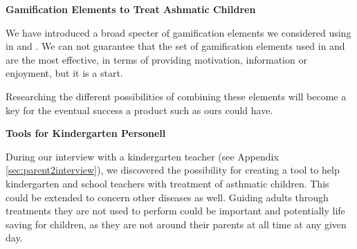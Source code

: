\textbf{Gamification Elements to Treat Ashmatic Children}

We have introduced a broad specter of gamification elements we considered using in \app{} and \ab{}. We can not guarantee that the set of gamification elements used in \app{} and \ab{} are the most effective, in terms of providing motivation, information or enjoyment, but it is a start. 

Researching the different possibilities of combining these elements will become a key for the eventual success a product such as ours could have.    


\textbf{Tools for Kindergarten Personell}

During our interview with a kindergarten teacher (see Appendix \ref{sec:parent2interview}), we discovered the possibility for creating a tool to help kindergarten and school teachers with treatment of asthmatic children. This could be extended to concern other diseases as well. Guiding adults through treatments they are not used to perform could be important and potentially life saving for children, as they are not around their parents at all time at any given day.    

